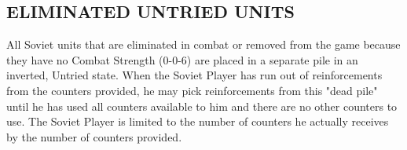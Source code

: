 \subsection{ELIMINATED UNTRIED UNITS}

All Soviet units that are eliminated in combat or removed from the game because they have no Combat Strength (0-0-6) are placed in a separate pile in an inverted, Untried state. When the Soviet Player has run out of reinforcements from the counters provided, he may pick reinforcements from this "dead pile" until he has used all counters available to him and there are no other counters to use. The Soviet Player is limited to the number of counters he actually receives by the number of counters provided.

